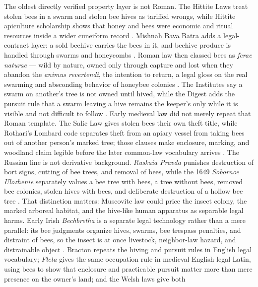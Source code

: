 \documentclass[
  english,
]{article}
\begin{document}
The oldest directly verified property layer is not Roman. The Hittite
Laws treat stolen bees in a swarm and stolen bee hives as tariffed
wrongs, while Hittite apiculture scholarship shows that honey and bees
were economic and ritual resources inside a wider cuneiform record
\citep{hittite_laws_bees, demirel2022_hittite_apiculture}. Mishnah Bava
Batra adds a legal-contract layer: a sold beehive carries the bees in
it, and beehive produce is handled through swarms and honeycombs
\citep{mishnah_bava_batra5_3_beehive}. Roman law then classed bees as
\emph{ferae naturae} --- wild by nature, owned only through capture and
lost when they abandon the \emph{animus revertendi}, the intention to
return, a legal gloss on the real swarming and absconding behavior of
honeybee colonies \citep{johnson2023honeybeebiology}. The Institutes say
a swarm on another's tree is not owned until hived, while the Digest
adds the pursuit rule that a swarm leaving a hive remains the keeper's
only while it is visible and not difficult to follow
\citep{justinian533, justinian_digest41}. Early medieval law did not
merely repeat that Roman template. The Salic Law gives stolen bees their
own theft title, while Rothari's Lombard code separates theft from an
apiary vessel from taking bees out of another person's marked tree;
those clauses make enclosure, marking, and woodland claim legible before
the later common-law vocabulary arrives
\citep{lex_salica_bees, edictum_rothari_bees}. The Russian line is not
derivative background. \emph{Ruskaia Pravda} punishes destruction of
bort signs, cutting of bee trees, and removal of bees, while the 1649
\emph{Sobornoe Ulozhenie} separately values a bee tree with bees, a tree
without bees, removed bee colonies, stolen hives with bees, and
deliberate destruction of a hollow bee tree
\citep{ruskaia_pravda_bees, sobornoe_ulozhenie1649_bees}. That
distinction matters: Muscovite law could price the insect colony, the
marked arboreal habitat, and the hive-like human apparatus as separable
legal harms. Early Irish \emph{Bechbretha} is a separate legal
technology rather than a mere parallel: its bee judgments organize
hives, swarms, bee trespass penalties, and distraint of bees, so the
insect is at once livestock, neighbor-law hazard, and distrainable
object \citep{bechbretha_bee_judgments, bechbretha1983}. Bracton repeats
the hiving and pursuit rules in English legal vocabulary; \emph{Fleta}
gives the same occupation rule in medieval English legal Latin, using
bees to show that enclosure and practicable pursuit matter more than
mere presence on the owner's land; and the Welsh laws give both
\end{document}
